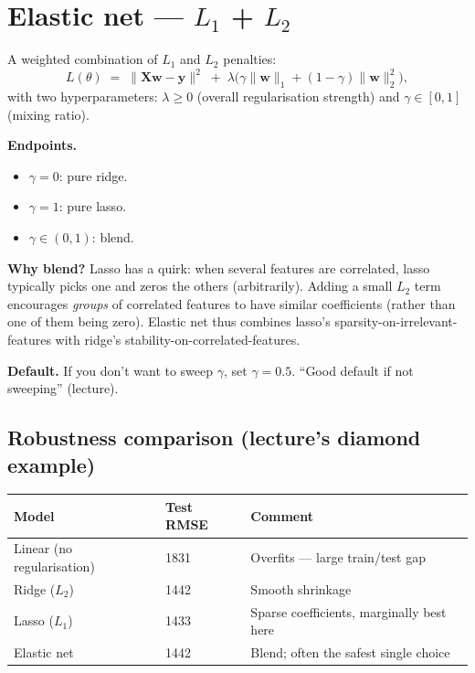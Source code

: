 \documentclass[11pt, a4paper]{article}
\newcommand{\thead}[1]{\textbf{#1}}
\begin{document}
\section{Elastic net --- $L_1$ + $L_2$}

\begin{defbox}
A weighted combination of $L_1$ and $L_2$ penalties:
\[
L(\theta) \;=\; \|\mathbf{X}\mathbf{w} - \mathbf{y}\|^2 \;+\; \lambda\big(\gamma\|\mathbf{w}\|_1 + (1-\gamma)\|\mathbf{w}\|_2^2\big),
\]
with two hyperparameters: $\lambda \ge 0$ (overall regularisation strength) and $\gamma \in [0,1]$ (mixing ratio).
\end{defbox}

\textbf{Endpoints.}
\begin{itemize}
  \item $\gamma = 0$: pure ridge.
  \item $\gamma = 1$: pure lasso.
  \item $\gamma \in (0, 1)$: blend.
\end{itemize}

\textbf{Why blend?} Lasso has a quirk: when several features are correlated, lasso typically picks one and zeros the others (arbitrarily). Adding a small $L_2$ term encourages \emph{groups} of correlated features to have similar coefficients (rather than one of them being zero). Elastic net thus combines lasso's sparsity-on-irrelevant-features with ridge's stability-on-correlated-features.

\textbf{Default.} If you don't want to sweep $\gamma$, set $\gamma = 0.5$. ``Good default if not sweeping'' (lecture).

\subsection{Robustness comparison (lecture's diamond example)}

\begin{tabularx}{\linewidth}{@{}lXX@{}}
\toprule
\thead{Model} & \thead{Test RMSE} & \thead{Comment} \\
\midrule
Linear (no regularisation) & 1831 & Overfits — large train/test gap \\
Ridge ($L_2$)       & 1442 & Smooth shrinkage \\
Lasso ($L_1$)       & 1433 & Sparse coefficients, marginally best here \\
Elastic net         & 1442 & Blend; often the safest single choice \\
\bottomrule
\end{tabularx}
\end{document}
